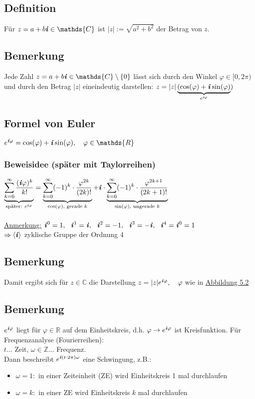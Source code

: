 \documentclass[12pt,titlepage, pdf]{article}
\newcommand{\R}{\mathds{R}}
\newcommand{\Z}{\mathds{Z}}
\newcommand{\C}{\mathds{C}}
\newcommand{\uline}[1]{\underline{#1}}
\renewcommand{\i}{\textbf{\textit{i}}}
\renewcommand{\>}{\rightarrow}
\renewcommand{\*}{\cdot}
\renewcommand{\phi}{\varphi}
\begin{document}
	\subsection{Definition}
	Für $z = a+b\i \in \C$ ist $|z| := \sqrt{a^2 + b^2}$ der Betrag von $z$.
	\subsection{Bemerkung}
	Jede Zahl $z = a+b\i \in \C \setminus \{0\} $ lässt sich durch den Winkel $\phi \in [0,2\pi)$ und durch den Betrag $|z|$ eineindeutig darstellen: 
	$z = |z|\underbrace{(\cos(\phi) + \i \sin(\phi)}_{e^{\i\phi}})$
	\subsection{Formel von Euler}
	\label{5.5}
	$e^{\i\phi} = \cos(\phi) + \i \sin(\phi),~~~ \phi \in \R$
	\subsubsection*{Beweisidee (später mit Taylorreihen)}
	$\underbrace{\sum_{k = 0}^{\infty} \frac{(\i\phi)^k}{k!}}_{\text{später: }e^{\i\phi}} = \underbrace{\sum_{k = 0}^{\infty}(-1)^k \cdot \frac{\phi^{2k}}{(2k)!}}_{\cos(\phi)\textrm{, gerade }k} + \i \cdot \underbrace{ \sum_{k = 0}^{\infty}(-1)^k \cdot \frac{\phi^{2k+1}}{(2k+1)!}}_{\sin(\phi)\textrm{, ungerade }k}$\\
	\\
	\uline{Anmerkung:} $\i^0 = 1,~~ \i^1 = \i,~~ \i^2 = -1,~~ \i^3 = -\i,~~ \i^4 = \i^0 = 1$\\
	$\Rightarrow \langle \i \rangle$ zyklische Gruppe der Ordnung 4
	\subsection{Bemerkung}
	Damit ergibt sich für $z \in \C$ die Darstellung $z = |z| e^{\i\phi},~~~ \phi$ wie in \hyperref[5.2]{Abbildung 5.2}
	\subsection{Bemerkung}
	$e^{\i\phi}$ liegt für $\phi \in \R$ auf dem Einheitskreis, d.h. $\phi \rightarrow e^{\i\phi}$ ist Kreisfunktion. Für Frequenzanalyse (Fourierreihen): \\
	$t$... Zeit, $\omega \in \Z$... Frequenz. \\
	Dann beschreibt $e^{\i(t \cdot 2\pi) \omega}$ eine Schwingung, z.B.:
	\begin{itemize}
		\item $\omega = 1:$ in einer Zeiteinheit (ZE) wird Einheitskreis 1 mal durchlaufen
		\item $\omega = k:$ in einer ZE wird Einheitskreis $k$ mal durchlaufen
	\end{itemize}
\end{document}
